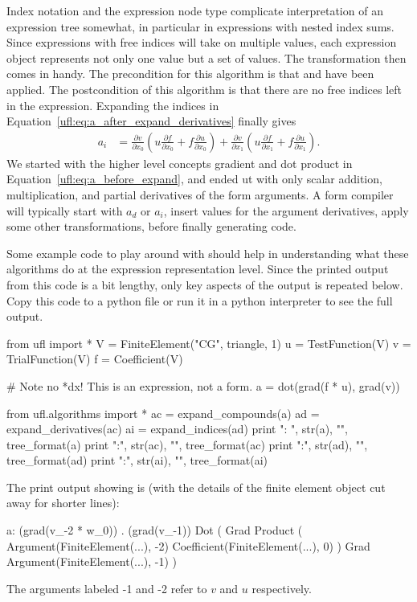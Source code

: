 Index notation and the  expression node type
complicate interpretation of an expression tree somewhat,
in particular in expressions with nested index sums.
Since expressions with free indices will take on multiple values,
each expression object represents not only one value but a set of values.
The transformation  then comes in handy.
The precondition for this algorithm
is that  and  have
been applied. The postcondition of this algorithm is that there are no
free indices left in the expression. Expanding the indices in
Equation~\eqref{ufl:eq:a_after_expand_derivatives} finally gives
\begin{align} \label{ufl:eq:a_after_expand_indices}
a_i &= \frac{\partial v}{\partial x_0} (u \frac{\partial f}{\partial x_0} + f \frac{\partial u}{\partial x_0}) + \frac{\partial v}{\partial x_1} (u \frac{\partial f}{\partial x_1} + f \frac{\partial u}{\partial x_1}).
\end{align}
We started with the higher level concepts gradient and dot product
in Equation~\eqref{ufl:eq:a_before_expand}, and ended ut with
only scalar addition, multiplication, and partial derivatives
of the form arguments. A form compiler will typically start
with $a_d$ or $a_i$, insert values for the argument derivatives,
apply some other transformations, before finally generating code.

Some example code to play around with should help in understanding
what these algorithms do at the expression representation level.
Since the printed output from this code is a bit lengthy, only
key aspects of the output is repeated below. Copy this code
to a python file or run it in a python interpreter to
see the full output.
\begin{python}
from ufl import *
V = FiniteElement("CG", triangle, 1)
u = TestFunction(V)
v = TrialFunction(V)
f = Coefficient(V)

# Note no *dx! This is an expression, not a form.
a = dot(grad(f * u), grad(v))

from ufl.algorithms import *
ac = expand_compounds(a)
ad = expand_derivatives(ac)
ai = expand_indices(ad)
print "\na: ", str(a),  "\n", tree_format(a)
print "\nac:", str(ac), "\n", tree_format(ac)
print "\nad:", str(ad), "\n", tree_format(ad)
print "\nai:", str(ai), "\n", tree_format(ai)
\end{python}


The print output showing  is (with the details of the finite
element object cut away for shorter lines):
\begin{python}
a:  (grad(v_{-2} * w_0)) . (grad(v_{-1}))
Dot
(
    Grad
        Product
        (
            Argument(FiniteElement(...), -2)
            Coefficient(FiniteElement(...), 0)
        )
    Grad
        Argument(FiniteElement(...), -1)
)
\end{python}
The arguments labeled -1 and -2 refer to $v$ and $u$ respectively.

